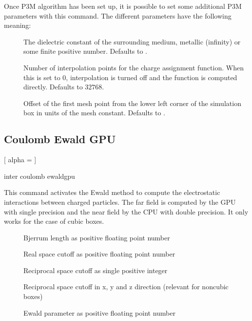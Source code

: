 Once P3M algorithm has been set up, it is possible to set some
additional P3M parameters with this command.  The different parameters
have the following meaning:
\begin{description}
\item[ ] The dielectric constant of the
  surrounding medium, metallic (\ie infinity) or some finite positive
  number.  Defaults to .
\item[ ] Number of interpolation
  points for the charge assignment function.  When this is set to $0$,
  interpolation is turned off and the function is computed directly.
  Defaults to $32768$.
\item[ ] Offset of the first mesh point
  from the lower left corner of the simulation box in units of the
  mesh constant. Defaults to .
\end{description}


\subsection{Coulomb Ewald GPU}
\label{sec:coulombewald}

\begin{pysyntax}
	[
		alpha = 
	]
	\begin{features}
	\end{features}
\end{pysyntax}
\begin{essyntax}
  inter coulomb  ewaldgpu 
    
  \begin{features}
  \end{features}
\end{essyntax}

This command activates the Ewald method to compute the electrostatic
interactions between charged particles.  The far field is computed by the GPU with single precision and the near field by the CPU with double precision. It only works for the case of cubic boxes.
\begin{description}
\item[] Bjerrum length as positive floating point number
\item[] Real space cutoff as positive floating point number
\item[] Reciprocal space cutoff as single positive integer
\item[] Reciprocal space cutoff in x, y and z direction  (relevant for noncubic boxes)
\item[] Ewald parameter as positive floating point number
\end{description}

